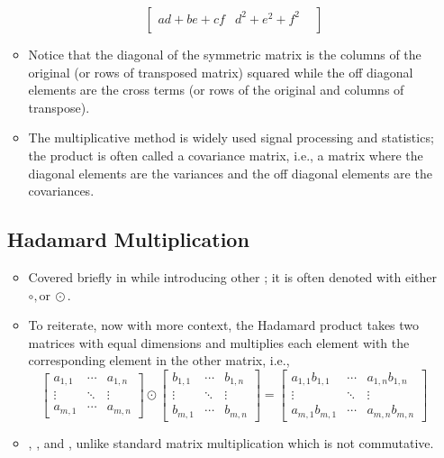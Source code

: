 \begin{itemize}
\begin{itemize}
\[\begin{bmatrix}
      ad+be+cf & d^2+e^2+f^2 &  \\
      \end{bmatrix}
      \]%
      \item Notice that the diagonal of the symmetric matrix is the columns of the original (or rows of transposed matrix) squared while the off diagonal elements are the cross terms (or rows of the original and columns of transpose).
      \item The multiplicative method is widely used signal processing and statistics; the product is often called a covariance matrix, i.e., a matrix where the diagonal elements are the variances and the off diagonal elements are the covariances.
  \end{itemize}
  
  \subsection{Hadamard Multiplication}\label{Hadamard Multiplication}
  \begin{itemize}
    \item Covered briefly in while introducing other \hyperref[Other Properties of Vectors]{}; it is often denoted with either \( \circ, \text{or}~\odot \).
    \item To reiterate, now with more context, the Hadamard product takes two matrices with equal dimensions and multiplies each element with the corresponding element in the other matrix, i.e.,
    \[%
    \begin{bmatrix}
    a_{1,1}  & \cdots & a_{1,n} \\
    \vdots & \ddots & \vdots \\
    a_{m,1}  & \cdots & a_{m,n}
    \end{bmatrix}
    \odot
    \begin{bmatrix}
      b_{1,1}  & \cdots & b_{1,n} \\
      \vdots & \ddots & \vdots \\
      b_{m,1}  & \cdots & b_{m,n}
    \end{bmatrix}
    =
    \begin{bmatrix}
      a_{1,1}b_{1,1}  & \cdots & a_{1,n}b_{1,n} \\
      \vdots & \ddots & \vdots \\
      a_{m,1} b_{m,1}  & \cdots & a_{m,n}b_{m,n}
    \end{bmatrix}
    \]%
    \item {}, , and , unlike standard matrix multiplication which is not commutative.
  \end{itemize}
\end{itemize}


